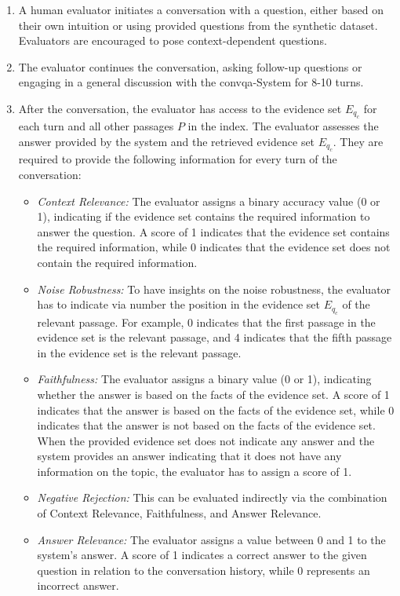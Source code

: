 \begin{enumerate}
    \item A human evaluator initiates a conversation with a question, either based on their own intuition or using provided questions from the synthetic dataset. Evaluators are encouraged to pose context-dependent questions.
    \item The evaluator continues the conversation, asking follow-up questions or engaging in a general discussion with the \gls{convqa}-System for 8-10 turns.
    \item After the conversation, the evaluator has access to the evidence set $E_{q_c}$ for each turn and all other passages $P$ in the index. The evaluator assesses the answer provided by the system and the retrieved evidence set $E_{q_c}$. They are required to provide the following information for every turn of the conversation:
        \begin{itemize}
            \item \textit{Context Relevance:} The evaluator assigns a binary accuracy value (0 or 1), indicating if the evidence set contains the required information to answer the question. A score of 1 indicates that the evidence set contains the required information, while 0 indicates that the evidence set does not contain the required information.
            \item \textit{Noise Robustness:} To have insights on the noise robustness, the evaluator has to indicate via number the position in the evidence set $E_{q_c}$ of the relevant passage. For example, 0 indicates that the first passage in the evidence set is the relevant passage, and 4 indicates that the fifth passage in the evidence set is the relevant passage.
            \item \textit{Faithfulness:} The evaluator assigns a binary value (0 or 1), indicating whether the answer is based on the facts of the evidence set. A score of 1 indicates that the answer is based on the facts of the evidence set, while 0 indicates that the answer is not based on the facts of the evidence set. When the provided evidence set does not indicate any answer and the system provides an answer indicating that it does not have any information on the topic, the evaluator has to assign a score of 1.
            \item \textit{Negative Rejection:} This can be evaluated indirectly via the combination of Context Relevance, Faithfulness, and Answer Relevance.
            \item \textit{Answer Relevance:} The evaluator assigns a value between 0 and 1 to the system's answer. A score of 1 indicates a correct answer to the given question in relation to the conversation history, while 0 represents an incorrect answer.

\end{itemize}
\end{enumerate}
